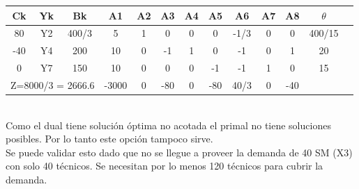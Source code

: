 \documentclass{article}
\begin{document}
\begin{enumerate}
\begin{tabular}{|c  c  c | c  c  c  c  c  c  c  c  c | c |}
			 Ck & Yk & Bk & A1 & A2 & A3 & A4 & A5 & A6 & A7 & A8 & $\theta$\\ \hline 
			 80 & Y2 & 400/3 & 5 & 1 & 0 & 0 & 0 & -1/3 & 0 & 0 & 400/15\\
			 -40 & Y4 & 200 & 10 & 0 & -1 & 1 & 0 & -1 & 0 & 1 & 20\\
			 0 & Y7 & 150 & 10 & 0 & 0 & 0 & -1 & -1 & 1 & 0 & 15\\ \hline
			 \multicolumn{3}{|c|}{Z=8000/3 = 2666.6} & -3000 & 0 & -80 & 0 & -80 & 40/3 & 0 & -40 &\\ \hline
		\end{tabular}
		\medskip\\
	    Como el dual tiene soluci\'on \'optima no acotada el primal no tiene soluciones posibles. Por lo tanto este opci\'on tampoco sirve. 
     	\smallskip\\
	    Se puede validar esto dado que no se llegue a proveer la demanda de 40 SM (X3) con solo 40 t\'ecnicos. Se necesitan por lo menos 120 t\'ecnicos para cubrir la demanda.
		\medskip\\


\end{enumerate}
\end{document}
